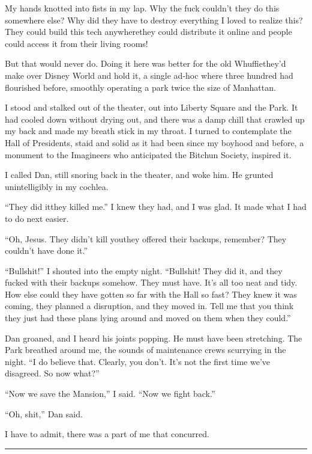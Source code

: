 My hands knotted into fists in my lap. Why the fuck couldn't they
do this somewhere else? Why did they have to destroy everything I
loved to realize this? They could build this tech anywhere{\dash}they
could distribute it online and people could access it from their
living rooms!

But that would never do. Doing it here was better for the old
Whuffie{\dash}they'd make over Disney World and hold it, a single ad-hoc
where three hundred had flourished before, smoothly operating a
park twice the size of Manhattan.

I stood and stalked out of the theater, out into Liberty Square and
the Park. It had cooled down without drying out, and there was a
damp chill that crawled up my back and made my breath stick in my
throat. I turned to contemplate the Hall of Presidents, staid and
solid as it had been since my boyhood and before, a monument to the
Imagineers who anticipated the Bitchun Society, inspired it.

I called Dan, still snoring back in the theater, and woke him. He
grunted unintelligibly in my cochlea.

“They did it{\dash}they killed me.” I knew they had, and I was glad. It
made what I had to do next easier.

“Oh, Jesus. They didn't kill you{\dash}they offered their backups,
remember? They couldn't have done it.”

“Bullshit!” I shouted into the empty night. “Bullshit! They did it,
and they fucked with their backups somehow. They must have. It's
all too neat and tidy. How else could they have gotten so far with
the Hall so fast? They knew it was coming, they planned a
disruption, and they moved in. Tell me that you think they just had
these plans lying around and moved on them when they could.”

Dan groaned, and I heard his joints popping. He must have been
stretching. The Park breathed around me, the sounds of maintenance
crews scurrying in the night. “I do believe that. Clearly, you
don't. It's not the first time we've disagreed. So now what?”

“Now we save the Mansion,” I said. “Now we fight back.”

“Oh, shit,” Dan said.

I have to admit, there was a part of me that concurred.

\begin{center}\rule{1in}{0.4pt}\end{center}

